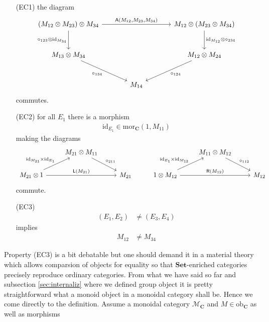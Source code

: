 \begin{enumerate}
\item[(EC1)]
the diagram
\[
\begin{tikzcd}[sep=large]
  \left(
    M_{12}
    \otimes
    M_{23}
  \right)
  \otimes
  M_{34}
  \arrow{rr}{\mathsf{A}(M_{12},M_{23},M_{34})}
  \arrow[swap]{d}{\circ_{123} \otimes \mathrm{id}_{M_{34}}}
  &
  &
  M_{12}
  \otimes
  \left(
    M_{23}
    \otimes
    M_{34}
  \right)
  \arrow{d}{\mathrm{id}_{M_{12}} \otimes \circ_{234}}
  \\
  M_{13}
  \otimes
  M_{34}
  \arrow[swap]{dr}{\circ_{134}}
  &
  &
  M_{12}
  \otimes
  M_{24}
  \arrow{dl}{\circ_{124}}
  \\
  &
  M_{14}
  &
\end{tikzcd}
\]
commutes.
\item[(EC2)]
for all $E_{1}$ there is a morphism
\begin{align*}
  \mathrm{id}_{E_{1}}
  \in
  \mathrm{mor}_{\mathbf{C}}(1,M_{11})
\end{align*}
making the diagrams
\[
\begin{tikzcd}[sep=normal]
  &
  M_{21}
  \otimes
  M_{11}
  \arrow{dr}{\circ_{211}}
  &
  &
  &
  M_{11}
  \otimes
  M_{12}
  \arrow{dr}{\circ_{112}}
  &
  \\
  M_{21}
  \otimes
  1
  \arrow{ur}{\mathrm{id}_{M_{21}} \times \mathrm{id}_{E_{1}}}
  \arrow{rr}{\mathsf{L}(M_{21})}
  &
  &
  M_{21}
  &
  1
  \otimes
  M_{12}
  \arrow{ur}{\mathrm{id}_{E_{1}} \times \mathrm{id}_{M_{12}}}
  \arrow{rr}{\mathsf{R}(M_{12})}
  &
  &
  M_{12}
\end{tikzcd}
\]
commute.
\item[(EC3)]
\begin{align*}
  (E_{1},E_{2})
  &\neq
  (E_{3},E_{4})
\end{align*}
implies
\begin{align*}
  M_{12}
  &\neq
  M_{34}
\end{align*}
\end{enumerate}
Property (EC3) is a bit debatable but one should demand it in a material theory which allows comparsion of objects for equality so that $\mathbf{Set}$-enriched categories precisely reproduce ordinary categories. From what we have said so far and subsection \ref{sec:internaliz} where we defined group object it is pretty straightforward what a monoid object in a monoidal category shall be. Hence we come directly to the definition. Assume a monoidal category $\mathcal{M}_{\mathbf{C}}$ and $M \in \mathrm{ob}_{\mathbf{C}}$ as well as morphisms
